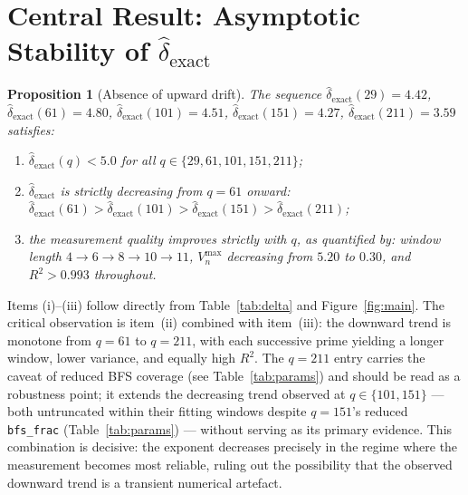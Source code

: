 \documentclass[11pt,a4paper]{article}
\theoremstyle{plain}
\newtheorem{proposition}[theorem]{Proposition}
\theoremstyle{definition}
\newcommand{\dhat}{\hat\delta_{\mathrm{exact}}}
\begin{document}
  \section{Central Result: Asymptotic Stability of $\dhat$}
  \label{sec:stability}

  \begin{proposition}[Absence of upward drift]
    \label{prop:stability}
    The sequence $\dhat(29) = 4.42$, $\dhat(61) = 4.80$, $\dhat(101) = 4.51$,
    $\dhat(151) = 4.27$, $\dhat(211) = 3.59$ satisfies:
    \begin{enumerate}
      \item[(i)] $\dhat(q) < 5.0$ for all $q \in \{29, 61, 101, 151, 211\}$;
      \item[(ii)] $\dhat$ is strictly decreasing from $q = 61$ onward:
      $\dhat(61) > \dhat(101) > \dhat(151) > \dhat(211)$;
      \item[(iii)] the measurement quality improves \emph{strictly} with $q$,
      as quantified by: window length $4 \to 6 \to 8 \to 10 \to 11$,
      $V_n^{\max}$ decreasing from $5.20$ to $0.30$, and $R^2 > 0.993$ throughout.
    \end{enumerate}
  \end{proposition}

  Items (i)--(iii) follow directly from Table~\ref{tab:delta} and
  Figure~\ref{fig:main}.
  The critical observation is item~(ii) combined with item~(iii): the downward
  trend is monotone from $q = 61$ to $q = 211$, with each successive prime
  yielding a longer window, lower variance, and equally high $R^2$.
  The $q = 211$ entry carries the caveat of reduced BFS coverage (see
  Table~\ref{tab:params}) and should be read as a robustness point; it
  extends the decreasing trend observed at $q \in \{101, 151\}$ — both
  untruncated within their fitting windows despite $q=151$'s reduced
  \texttt{bfs\_frac} (Table~\ref{tab:params}) — without serving as its primary
  evidence.
  This combination is decisive: the exponent decreases precisely in the regime
  where the measurement becomes most reliable, ruling out the possibility that
  the observed downward trend is a transient numerical artefact.
\end{document}
